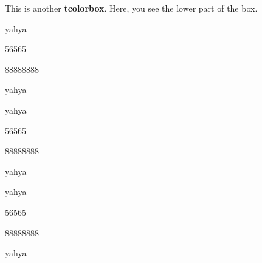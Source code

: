 \documentclass[a4paper,12pt]{article}
\begin{document}
\begin{tcolorbox}[title=\RL{Altmryn $1$},breakable,enhanced ,interior  hidden]
This is another \textbf{tcolorbox}.
\tcblower
Here, you see the lower part of the box.
\vspace{5cm}

yahya

\vspace{5cm}
56565

\vspace{5cm}
88888888

\vspace{5cm}

 yahya

\vspace{5cm}

yahya

\vspace{5cm}
56565

\vspace{5cm}
88888888

\vspace{5cm}

 yahya
 
 \vspace{5cm}

yahya

\vspace{5cm}
56565

\vspace{5cm}
88888888

\vspace{5cm}

 yahya
\end{tcolorbox}
\end{document}
